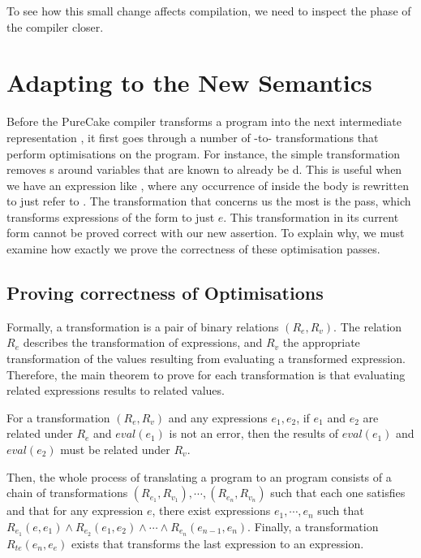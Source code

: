 To see how this small change affects compilation, we need to inspect the
\ThunkLang{} phase of the compiler closer.

\section{Adapting \ThunkLang{} to the New Semantics}

Before the PureCake compiler transforms a \ThunkLang{} program into the next
intermediate representation \EnvLang{}, it first goes through a number of
\ThunkLang{}-to-\ThunkLang{} transformations that perform optimisations on the
program. For instance, the simple transformation  removes
s around variables that are known to already be d.
This is useful when we have an expression like ,
where any occurrence of  inside the body is rewritten to just
refer to . The transformation that concerns us the most is the
 pass, which transforms expressions of the form
 to just $e$. This transformation in its current form
cannot be proved correct with our new assertion. To explain why, we must examine
how exactly we prove the correctness of these optimisation passes.

\subsection{Proving correctness of \ThunkLang{} Optimisations}

Formally, a transformation is a pair of binary relations $(R_e,R_v)$. The
relation $R_e$ describes the transformation of expressions, and $R_v$ the
appropriate transformation of the values resulting from evaluating a transformed
expression. Therefore, the main theorem to prove for each transformation is that
evaluating related expressions results to related values.

\begin{theorem} For a transformation $(R_e,R_v)$ and
  any expressions $e_1,e_2$, if $e_1$ and $e_2$ are related under $R_e$ and
  $eval(e_1)$ is not an error,
  then the results of $eval(e_1)$ and $eval(e_2)$ must be related under $R_v$.
\end{theorem}

Then, the whole process of translating a \ThunkLang{} program to an \EnvLang{}
program consists of a chain of transformations $(R_{e_1},R_{v_1}), \cdots,
(R_{e_n},R_{v_n})$ such that each one satisfies  and that
for any \ThunkLang{} expression $e$, there exist \ThunkLang{} expressions
$e_1,\cdots,e_n$ such that $R_{e_1}(e,e_1) \land R_{e_2}(e_1,e_2) \land \cdots
\land R_{e_n}(e_{n-1},e_n)$. Finally, a transformation $R_{te}(e_n,e_e)$ exists
that transforms the last \ThunkLang{} expression to an \EnvLang{} expression.

